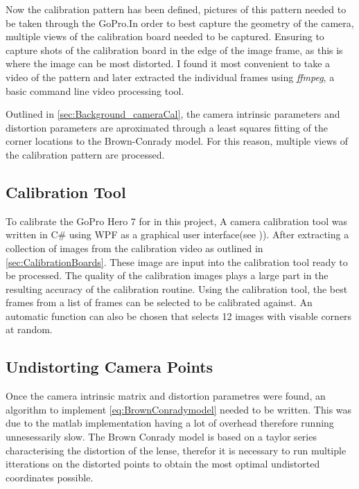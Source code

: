 \documentclass{UoNMCHA}
\numberwithin{equation}{section}
\begin{document}
Now the calibration pattern has been defined, pictures of this pattern needed to be taken through the GoPro.In order to best capture the geometry of the camera, multiple views of the calibration board needed to be captured. Ensuring to capture shots of the calibration board in the edge of the image frame, as this is where the image can be most distorted. I found it most convenient to take a video of the pattern and later extracted the individual frames using \textit{ffmpeg}, a basic command line video processing tool.

Outlined in \cref{sec:Background_cameraCal}, the camera intrinsic parameters and distortion parameters are aproximated through a least squares fitting of the corner locations to the Brown-Conrady model. For this reason, multiple views of the calibration pattern are processed.

\subsection{Calibration Tool}
To calibrate the GoPro Hero 7 for in this project, A camera calibration tool was written in C\# using WPF as a graphical user interface(see )). After extracting a collection of images from the calibration video as outlined in \cref{sec:CalibrationBoards}. These image are input into the calibration tool ready to be processed. The quality of the calibration images plays a large part in the resulting accuracy of the calibration routine. Using the calibration tool, the best frames from a list of frames can be selected to be calibrated against. An automatic function can also be chosen that selects 12 images with visable corners at random.

\subsection{Undistorting Camera Points}
Once the camera intrinsic matrix and distortion parametres were found, an algorithm to implement \cref{eq:BrownConradymodel} needed to be written. This was due to the matlab implementation having a lot of overhead therefore running unnesessarily slow. The Brown Conrady model is based on a taylor series characterising the distortion of the lense, therefor it is necessary to run multiple itterations on the distorted points to obtain the most optimal undistorted coordinates possible.
\end{document}
